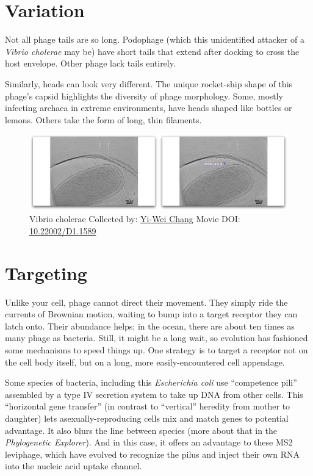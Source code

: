 \documentclass[]{tufte-book}
\begin{document}
\section{Variation}\label{variation}

Not all phage tails are so long. Podophage (which this unidentified
attacker of a \emph{Vibrio cholerae} may be) have short tails that
extend after docking to cross the host envelope. Other phage lack tails
entirely.

Similarly, heads can look very different. The unique rocket-ship shape
of this phage's capsid highlights the diversity of phage morphology.
Some, mostly infecting archaea in extreme environments, have heads
shaped like bottles or lemons. Others take the form of long, thin
filaments.





\begin{figure}
\includegraphics{movie_stills/10_4} \caption[Vibrio cholerae Collected by:
\protect\hyperlink{yi-wei_chang}{Yi-Wei Chang} Movie DOI:
\href{https://doi.org/10.22002/D1.1589}{10.22002/D1.1589}]{Vibrio cholerae Collected by:
\protect\hyperlink{yi-wei_chang}{Yi-Wei Chang} Movie DOI:
\href{https://doi.org/10.22002/D1.1589}{10.22002/D1.1589}}\label{fig:10-4}
\end{figure}

\section{Targeting}\label{targeting}

Unlike your cell, phage cannot direct their movement. They simply ride
the currents of Brownian motion, waiting to bump into a target receptor
they can latch onto. Their abundance helps; in the ocean, there are
about ten times as many phage as bacteria. Still, it might be a long
wait, so evolution has fashioned some mechanisms to speed things up. One
strategy is to target a receptor not on the cell body itself, but on a
long, more easily-encountered cell appendage.

Some species of bacteria, including this \emph{Escherichia coli} use
``competence pili'' assembled by a type IV secretion system to take up
DNA from other cells. This ``horizontal gene transfer'' (in contrast to
``vertical'' heredity from mother to daughter) lets
asexually-reproducing cells mix and match genes to potential advantage.
It also blurs the line between species (more about that in the
\emph{Phylogenetic Explorer}). And in this case, it offers an advantage
to these MS2 leviphage, which have evolved to recognize the pilus and
inject their own RNA into the nucleic acid uptake channel.
\end{document}
